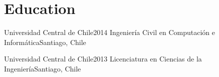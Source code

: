 \section{Education}
    \resumeSubHeadingListStart

    \resumeSubheading
    {Universidad Central de Chile}{2014}
    {Ingeniería Civil en Computación e Informática}{Santiago, Chile}

    \resumeSubheading
    {Universidad Central de Chile}{2013}
    {Licenciatura en Ciencias de la Ingeniería}{Santiago, Chile}

    \resumeSubHeadingListEnd
